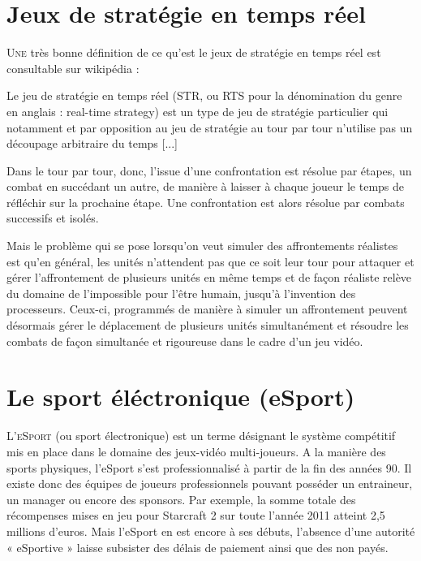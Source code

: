 \section{Jeux de stratégie en temps réel}%
\label{sec:jeux_de_strategie_en_temps_reel}

\lettrine{U}{ne} très bonne définition de ce qu'est le jeux de stratégie en
temps réel est consultable sur wikipédia :

  Le jeu de stratégie en temps réel (STR, ou RTS pour la
  dénomination du genre en anglais : real-time strategy) est un type de
  jeu de stratégie particulier qui notamment et par opposition au jeu de
  stratégie au tour par tour n’utilise pas un découpage arbitraire du
  temps [...]

  Dans le tour par tour, donc, l'issue d’une confrontation est résolue par
  étapes, un combat en succédant un autre, de manière à laisser à chaque
  joueur le temps de réfléchir sur la prochaine étape. Une confrontation
  est alors résolue par combats successifs et isolés.

  Mais le problème qui se pose lorsqu'on veut simuler des affrontements
  réalistes est qu’en général, les unités n’attendent pas que ce soit leur
  tour pour attaquer et gérer l'affrontement de plusieurs unités en même
  temps et de façon réaliste relève du domaine de l'impossible pour l'être
  humain, jusqu'à l'invention des processeurs. Ceux-ci, programmés de
  manière à simuler un affrontement peuvent désormais gérer le déplacement
  de plusieurs unités simultanément et résoudre les combats de façon
  simultanée et rigoureuse dans le cadre d’un jeu vidéo.

\section{Le sport éléctronique (eSport)}%
\label{sec:le_sport_electronique_esport_}

\lettrine{L}{’eSport} (ou sport électronique) est un terme désignant le
système compétitif mis en place dans le domaine des jeux-vidéo
multi-joueurs.  A la manière des sports physiques, l'eSport s’est
professionnalisé à partir de la fin des années 90. Il existe donc des
équipes de joueurs professionnels pouvant posséder un entraineur, un
manager ou encore des sponsors. Par exemple, la somme totale des
récompenses mises en jeu pour Starcraft 2 sur toute l’année 2011 atteint
2,5 millions d’euros.  Mais l'eSport en est encore à ses débuts,
l'absence d'une autorité « eSportive » laisse subsister des délais de
paiement ainsi que des non payés.

